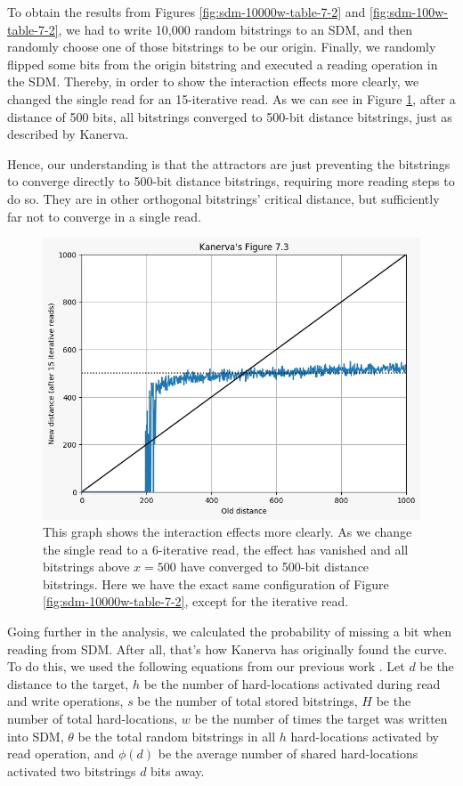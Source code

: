 To obtain the results from Figures \ref{fig:sdm-10000w-table-7-2} and \ref{fig:sdm-100w-table-7-2}, we had to write 10,000 random bitstrings to an SDM, and then randomly choose one of those bitstrings to be our origin. Finally, we randomly flipped some bits from the origin bitstring and executed a reading operation in the SDM. Thereby, in order to show the interaction effects more clearly, we changed the single read for an 15-iterative read. As we can see in Figure \ref{fig:sdm-10000w-table-7-2-15iter}, after a distance of 500 bits, all bitstrings converged to 500-bit distance bitstrings, just as described by Kanerva.

Hence, our understanding is that the attractors are just preventing the bitstrings to converge directly to 500-bit distance bitstrings, requiring more reading steps to do so. They are in other orthogonal bitstrings' critical distance, but sufficiently far not to converge in a single read.

\begin{figure}[h]
\centering\includegraphics[width=\textwidth]{images02/sdm-10000w-table-7-2-15iter.png}
\caption{This graph shows the interaction effects more clearly.  As we change the single read to a 6-iterative read, the effect has vanished and all bitstrings above $x=500$ have converged to 500-bit distance bitstrings. Here we have the exact same configuration of Figure \ref{fig:sdm-10000w-table-7-2}, except for the iterative read.
\label{fig:sdm-10000w-table-7-2-15iter}}
\end{figure}

Going further in the analysis, we calculated the probability of missing a bit when reading from SDM. After all, that's how Kanerva has originally found the curve. To do this, we used the following equations from our previous work \citep{brogliato2014sparse}. Let $d$ be the distance to the target, $h$ be the number of hard-locations activated during read and write operations, $s$ be the number of total stored bitstrings, $H$ be the number of total hard-locations, $w$ be the number of times the target was written into SDM, $\theta$ be the total random bitstrings in all $h$ hard-locations activated by read operation, and $\phi(d)$ be the average number of shared hard-locations activated two bitstrings $d$ bits away.

